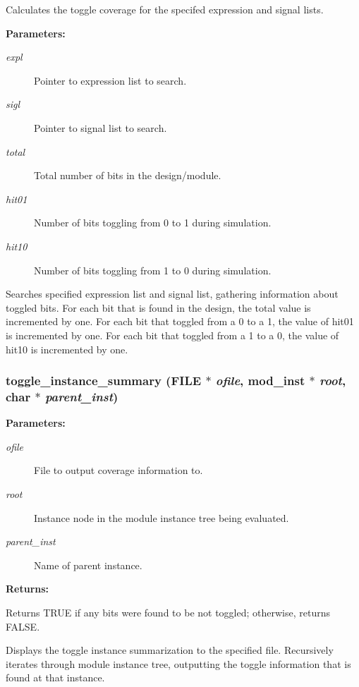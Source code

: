 Calculates the toggle coverage for the specifed expression and signal lists.

\begin{Desc}
\item[{\bf Parameters: }]\par
\begin{description}
\item[
{\em expl}]Pointer to expression list to search. \item[
{\em sigl}]Pointer to signal list to search. \item[
{\em total}]Total number of bits in the design/module. \item[
{\em hit01}]Number of bits toggling from 0 to 1 during simulation. \item[
{\em hit10}]Number of bits toggling from 1 to 0 during simulation.

\end{description}
\end{Desc}
Searches specified expression list and signal list, gathering information  about toggled bits. For each bit that is found in the design, the total value is incremented by one. For each bit that toggled from a 0 to a 1, the value of hit01 is incremented by one. For each bit that toggled from a 1 to a 0, the value of hit10 is incremented by one. 
\subsubsection{ toggle\_\-instance\_\-summary (FILE $\ast$ {\em ofile}, {\bf mod\_\-inst} $\ast$ {\em root}, char $\ast$ {\em parent\_\-inst})}\label{toggle_8c_a5}


\begin{Desc}
\item[{\bf Parameters: }]\par
\begin{description}
\item[
{\em ofile}]File to output coverage information to. \item[
{\em root}]Instance node in the module instance tree being evaluated. \item[
{\em parent\_\-inst}]Name of parent instance.

\end{description}
\end{Desc}
\begin{Desc}
\item[{\bf Returns: }]\par
Returns TRUE if any bits were found to be not toggled; otherwise, returns FALSE.

\end{Desc}
Displays the toggle instance summarization to the specified file. Recursively iterates through module instance tree, outputting the toggle information that is found at that instance. 
